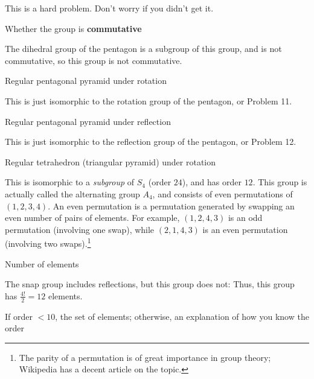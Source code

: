 \documentclass[../key.tex]{subfiles}
\begin{document}
This is a hard problem. Don't worry if you didn't get it.

\begin{inner_problem}
\item Whether the group is \textbf{commutative}
\end{inner_problem}

\noindent The dihedral group of the pentagon is a subgroup of this group, and is not commutative, so this group is not commutative.

\begin{outer_problem}
\item Regular pentagonal pyramid under rotation
\end{outer_problem}

\noindent This is just isomorphic to the rotation group of the pentagon, or Problem 11.

\begin{outer_problem}
\item Regular pentagonal pyramid under reflection
\end{outer_problem}

\noindent This is just isomorphic to the reflection group of the pentagon, or Problem 12.

\begin{outer_problem}
\item Regular tetrahedron (triangular pyramid) under rotation
\end{outer_problem}

\noindent This is isomorphic to a \textit{subgroup} of $S_4$ (order $24$), and has order $12$. This group is actually called the alternating group $A_4$, and consists of even permutations of $(1,2,3,4)$. An even permutation is a permutation generated by swapping an even number of pairs of elements. For example, $(1,2,4,3)$ is an odd permutation (involving one swap), while $(2,1,4,3)$ is an even permutation (involving two swaps).\footnote{The parity of a permutation is of great importance in group theory; Wikipedia has a decent article on the topic.}

\begin{inner_problem}[start=1]
\item Number of elements
\end{inner_problem}

\noindent The snap group includes reflections, but this group does not: Thus, this group has $\frac{4!}{2}=12$ elements.

\begin{inner_problem}
\item If order $< 10$, the set of elements; otherwise, an explanation of how you know the order
\end{inner_problem}
\end{document}
